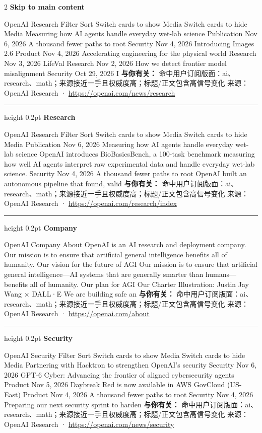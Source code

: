 \documentclass[10.5pt]{ctexart}
\begin{document}
\begin{multicols}{2}
{\large\bfseries Skip to main content}\par
OpenAI Research Filter Sort Switch cards to show Media Switch cards to hide Media Measuring how AI agents handle everyday wet-lab science Publication Nov 6, 2026 A thousand fewer paths to root Security Nov 4, 2026 Introducing Images 2.6 Product Nov 4, 2026 Accelerating engineering for the physical world Research Nov 3, 2026 LifeVal Research Nov 2, 2026 How we detect frontier model misalignment Security Oct 29, 2026 I
\textbf{与你有关：} 命中用户订阅版面：ai、research、math；来源接近一手且权威度高；标题/正文包含高信号变化
{\footnotesize\color{ormuted} 来源：OpenAI Research · \url{https://openai.com/news/research}}
\vspace{2mm}
\hrule height 0.2pt
\vspace{2mm}
{\large\bfseries Research}\par
OpenAI Research Filter Sort Switch cards to show Media Switch cards to hide Media Publication Nov 6, 2026 Measuring how AI agents handle everyday wet-lab science OpenAI introduces BioBasicsBench, a 100-task benchmark measuring how well AI agents interpret raw experimental data and handle everyday wet-lab science. Security Nov 4, 2026 A thousand fewer paths to root OpenAI built an autonomous pipeline that found, valid
\textbf{与你有关：} 命中用户订阅版面：ai、research、math；来源接近一手且权威度高；标题/正文包含高信号变化
{\footnotesize\color{ormuted} 来源：OpenAI Research · \url{https://openai.com/research/index}}
\vspace{2mm}
\hrule height 0.2pt
\vspace{2mm}
{\large\bfseries Company}\par
OpenAI Company About OpenAI is an AI research and deployment company. Our mission is to ensure that artificial general intelligence benefits all of humanity. Our vision for the future of AGI Our mission is to ensure that artificial general intelligence—AI systems that are generally smarter than humans—benefits all of humanity. Our plan for AGI Our Charter Illustration: Justin Jay Wang × DALL·E We are building safe an
\textbf{与你有关：} 命中用户订阅版面：ai、research、math；来源接近一手且权威度高；标题/正文包含高信号变化
{\footnotesize\color{ormuted} 来源：OpenAI Research · \url{https://openai.com/about}}
\vspace{2mm}
\hrule height 0.2pt
\vspace{2mm}
{\large\bfseries Security}\par
OpenAI Security Filter Sort Switch cards to show Media Switch cards to hide Media Partnering with Hacktron to strengthen OpenAI’s security Security Nov 6, 2026 GPT‑6 Cyber: Advancing the frontier of aligned cybersecurity agents Product Nov 5, 2026 Daybreak Red is now available in AWS GovCloud (US-East) Product Nov 4, 2026 A thousand fewer paths to root Security Nov 4, 2026 Preparing our next security sprint to harden
\textbf{与你有关：} 命中用户订阅版面：ai、research、math；来源接近一手且权威度高；标题/正文包含高信号变化
{\footnotesize\color{ormuted} 来源：OpenAI Research · \url{https://openai.com/news/security}}
\end{multicols}
\end{document}
